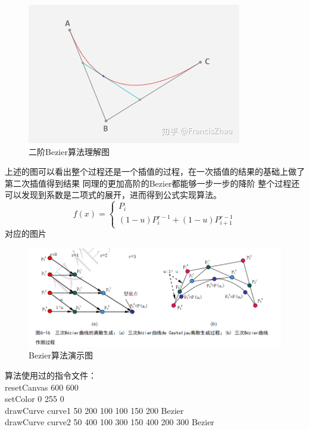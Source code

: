 \documentclass[a4paper,UTF8]{article}
\theoremstyle{definition}
\begin{document}
\begin{figure}[h]
	\centering
	\includegraphics[scale=0.8]{figure/b.png}
	\caption{二阶Bezier算法理解图}
	\label{fig:bezier-alg}
\end{figure}

上述的图可以看出整个过程还是一个插值的过程，在一次插值的结果的基础上做了第二次插值得到结果
同理的更加高阶的Bezier都能够一步一步的降阶
整个过程还可以发现到系数是二项式的展开，进而得到公式实现算法。\\

$$f(x)=
\begin{cases}
    P_{i}  \\
    (1-u)P_{i}^{r-1}+(1-u)P_{i+1}^{r-1}
\end{cases}
$$
对应的图片
\begin{figure}[h]
	\centering
	\includegraphics[scale=0.6]{figure/bezier2.png}
	\caption{Bezier算法演示图}
	\label{fig:bezier2}
\end{figure}

算法使用过的指令文件：\\

resetCanvas 600 600\\

setColor 0 255 0\\

drawCurve curve1 50 200 100 100 150 200 Bezier\\

drawCurve curve2 50 400 100 300 150 400 200 300 Bezier\\
\end{document}
